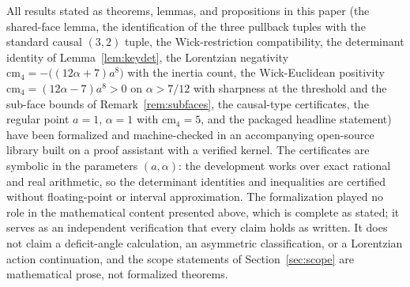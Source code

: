 \documentclass[11pt]{article}
\theoremstyle{definition}
\theoremstyle{remark}
\newcommand{\cm}{\mathrm{cm}_{4}}
\begin{document}
All results stated as theorems, lemmas, and propositions in this paper (the shared-face lemma, the identification of the three pullback tuples with the standard causal $(3,2)$ tuple, the Wick-restriction compatibility, the determinant identity of Lemma~\ref{lem:keydet}, the Lorentzian negativity $\cm=-\bigl((12\alpha+7)a^{8}\bigr)$ with the inertia count, the Wick-Euclidean positivity $\cm=(12\alpha-7)a^{8}>0$ on $\alpha>7/12$ with sharpness at the threshold and the sub-face bounds of Remark~\ref{rem:subfaces}, the causal-type certificates, the regular point $a=1$, $\alpha=1$ with $\cm=5$, and the packaged headline statement) have been formalized and machine-checked in an accompanying open-source library built on a proof assistant with a verified kernel. The certificates are symbolic in the parameters $(a,\alpha)$: the development works over exact rational and real arithmetic, so the determinant identities and inequalities are certified without floating-point or interval approximation. The formalization played no role in the mathematical content presented above, which is complete as stated; it serves as an independent verification that every claim holds as written. It does not claim a deficit-angle calculation, an asymmetric classification, or a Lorentzian action continuation, and the scope statements of Section~\ref{sec:scope} are mathematical prose, not formalized theorems.
\end{document}
